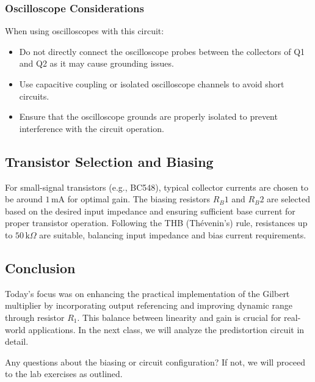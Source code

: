\subsubsection{Oscilloscope Considerations}

When using oscilloscopes with this circuit:
\begin{itemize}
    \item Do not directly connect the oscilloscope probes between the collectors of Q1 and Q2 as it may cause grounding issues.
    \item Use capacitive coupling or isolated oscilloscope channels to avoid short circuits.
    \item Ensure that the oscilloscope grounds are properly isolated to prevent interference with the circuit operation.
\end{itemize}

\subsection{Transistor Selection and Biasing}

For small-signal transistors (e.g., BC548), typical collector currents are chosen to be around $1\,\text{mA}$ for optimal gain. The biasing resistors $R_B1$ and $R_B2$ are selected based on the desired input impedance and ensuring sufficient base current for proper transistor operation. Following the THB (Thévenin's) rule, resistances up to $50\,\text{k}\Omega$ are suitable, balancing input impedance and bias current requirements.

\subsection{Conclusion}

Today's focus was on enhancing the practical implementation of the Gilbert multiplier by incorporating output referencing and improving dynamic range through resistor $R_1$. This balance between linearity and gain is crucial for real-world applications. In the next class, we will analyze the predistortion circuit in detail.

Any questions about the biasing or circuit configuration? If not, we will proceed to the lab exercises as outlined.


